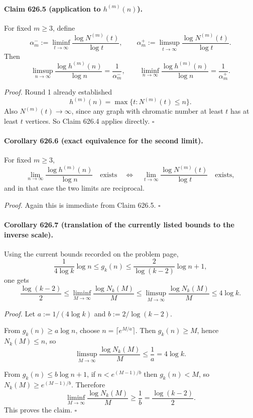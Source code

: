 \paragraph{Claim 626.5 (application to \(h^{(m)}(n)\)).}
For fixed \(m\ge 3\), define
\[
\alpha_m^-:=\liminf_{t\to\infty}\frac{\log N^{(m)}(t)}{\log t},
\qquad
\alpha_m^+:=\limsup_{t\to\infty}\frac{\log N^{(m)}(t)}{\log t}.
\]
Then
\[
\limsup_{n\to\infty}\frac{\log h^{(m)}(n)}{\log n}=\frac{1}{\alpha_m^-},
\qquad
\liminf_{n\to\infty}\frac{\log h^{(m)}(n)}{\log n}=\frac{1}{\alpha_m^+}.
\]

\emph{Proof.}
Round 1 already established
\[
h^{(m)}(n)=\max\{t:N^{(m)}(t)\le n\}.
\]
Also \(N^{(m)}(t)\to\infty\), since any graph with chromatic number at least \(t\) has at least \(t\) vertices. So Claim 626.4 applies directly. \(\square\)

\paragraph{Corollary 626.6 (exact equivalence for the second limit).}
For fixed \(m\ge 3\),
\[
\lim_{n\to\infty}\frac{\log h^{(m)}(n)}{\log n}
\quad\text{exists}
\quad\Longleftrightarrow\quad
\lim_{t\to\infty}\frac{\log N^{(m)}(t)}{\log t}
\quad\text{exists},
\]
and in that case the two limits are reciprocal.

\emph{Proof.}
Again this is immediate from Claim 626.5. \(\square\)

\paragraph{Corollary 626.7 (translation of the currently listed bounds to the inverse scale).}
Using the current bounds recorded on the problem page,
\[
\frac{1}{4\log k}\log n\le g_k(n)\le \frac{2}{\log(k-2)}\log n+1,
\]
one gets
\[
\frac{\log(k-2)}{2}
\le
\liminf_{M\to\infty}\frac{\log N_k(M)}{M}
\le
\limsup_{M\to\infty}\frac{\log N_k(M)}{M}
\le
4\log k.
\]

\emph{Proof.}
Let \(a:=1/(4\log k)\) and \(b:=2/\log(k-2)\).

From \(g_k(n)\ge a\log n\), choose \(n=\lceil e^{M/a}\rceil\). Then \(g_k(n)\ge M\), hence
\(N_k(M)\le n\), so
\[
\limsup_{M\to\infty}\frac{\log N_k(M)}{M}\le \frac{1}{a}=4\log k.
\]

From \(g_k(n)\le b\log n+1\), if \(n<e^{(M-1)/b}\) then \(g_k(n)<M\), so
\(N_k(M)\ge e^{(M-1)/b}\). Therefore
\[
\liminf_{M\to\infty}\frac{\log N_k(M)}{M}\ge \frac{1}{b}=\frac{\log(k-2)}{2}.
\]
This proves the claim. \(\square\)


